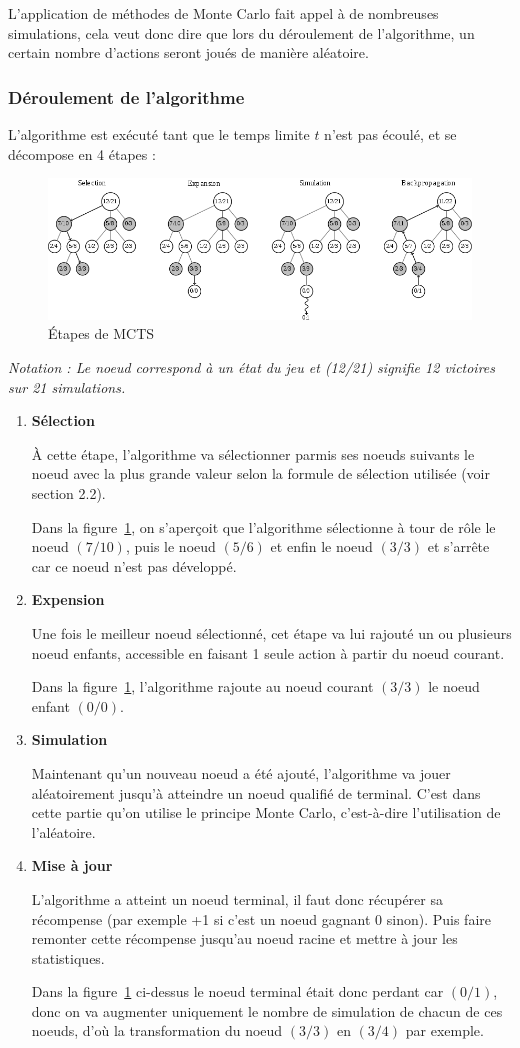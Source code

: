 \documentclass[pdftex,french, english]{article}	%
\begin{document}
	L'application de méthodes de Monte Carlo fait appel à de nombreuses simulations, cela veut donc dire que lors du déroulement de l'algorithme, un certain nombre d'actions seront joués de manière aléatoire.
	\subsubsection{Déroulement de l'algorithme}
	L'algorithme est exécuté tant que le temps limite $t$ n'est pas écoulé, et se décompose en 4 étapes :
	\begin{figure}[h]
		\centering
		\includegraphics[width=\textwidth]{etapes.png}
		\caption{ Étapes de MCTS}
		 \label{fig:mcts}
	\end{figure}

\textit{Notation : Le noeud correspond à un état du jeu et (12/21) signifie 12 victoires sur 21 simulations.} 
	\begin{enumerate}
		\item \textbf{Sélection}

		À cette étape, l'algorithme va sélectionner parmis ses noeuds suivants le noeud avec la plus grande valeur selon la formule de sélection utilisée (voir section 2.2). 

		Dans la figure~\ref{fig:mcts}, on s'aperçoit que l'algorithme sélectionne à tour de rôle le noeud $(7/10)$, puis le noeud $(5/6)$ et enfin le noeud $(3/3)$ et s'arrête car ce noeud n'est pas développé.
		\item \textbf{Expension}

		Une fois le meilleur noeud sélectionné, cet étape va lui rajouté un ou plusieurs noeud enfants, accessible en faisant 1 seule action à partir du noeud courant. 

		Dans la figure~\ref{fig:mcts}, l'algorithme rajoute au noeud courant $(3/3)$ le noeud enfant $(0/0)$.
		\item \textbf{Simulation}

		Maintenant qu'un nouveau noeud a été ajouté, l'algorithme va jouer aléatoirement jusqu'à atteindre un noeud qualifié de terminal.
		C'est dans cette partie qu'on utilise le principe Monte Carlo, c'est-à-dire l'utilisation de l'aléatoire.
		\item \textbf{Mise à jour} 

		L'algorithme a atteint un noeud terminal, il faut donc récupérer sa récompense (par exemple +1 si c'est un noeud gagnant 0 sinon). Puis faire remonter cette récompense jusqu'au noeud racine et mettre à jour les statistiques. 

		Dans la figure~\ref{fig:mcts} ci-dessus le noeud terminal était donc perdant car $(0/1)$, donc on va augmenter uniquement le nombre de simulation de chacun de ces noeuds, d'où la transformation du noeud $(3/3)$ en $(3/4)$ par exemple.
	\end{enumerate}
\end{document}
